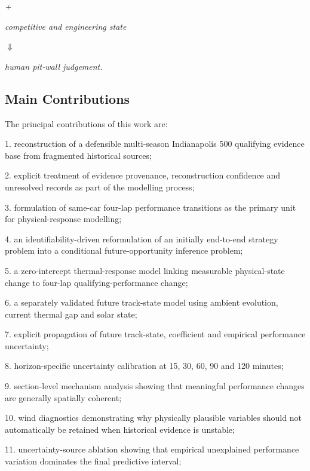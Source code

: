 \begin{center}\textit{+}\end{center}

\begin{center}\textit{competitive and engineering state}\end{center}

\begin{center}\textit{\ensuremath{\Downarrow}}\end{center}

\begin{center}\textit{human pit-wall judgement.}\end{center}

\subsection{Main Contributions}
The principal contributions of this work are:

1. reconstruction of a defensible multi-season Indianapolis 500 qualifying evidence base from fragmented historical sources;

2. explicit treatment of evidence provenance, reconstruction confidence and unresolved records as part of the modelling process;

3. formulation of same-car four-lap performance transitions as the primary unit for physical-response modelling;

4. an identifiability-driven reformulation of an initially end-to-end strategy problem into a conditional future-opportunity inference problem;

5. a zero-intercept thermal-response model linking measurable physical-state change to four-lap qualifying-performance change;

6. a separately validated future track-state model using ambient evolution, current thermal gap and solar state;

7. explicit propagation of future track-state, coefficient and empirical performance uncertainty;

8. horizon-specific uncertainty calibration at 15, 30, 60, 90 and 120 minutes;

9. section-level mechanism analysis showing that meaningful performance changes are generally spatially coherent;

10. wind diagnostics demonstrating why physically plausible variables should not automatically be retained when historical evidence is unstable;

11. uncertainty-source ablation showing that empirical unexplained performance variation dominates the final predictive interval;

